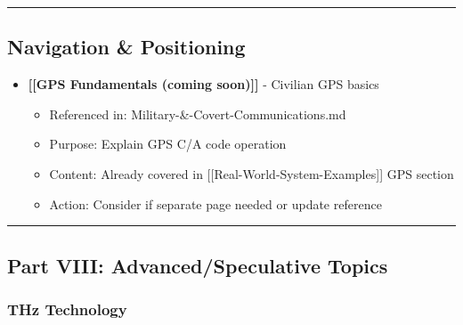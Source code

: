 \begin{center}\rule{0.5\linewidth}{0.5pt}\end{center}

\subsection{\texorpdfstring{ Navigation \&
Positioning}{ Navigation \& Positioning}}\label{navigation-positioning}

\begin{itemize}
\tightlist
\item
  \textbf{{[}{[}GPS Fundamentals (coming soon){]}{]}} - Civilian GPS
  basics

  \begin{itemize}
  \tightlist
  \item
    Referenced in: Military-\&-Covert-Communications.md
  \item
    Purpose: Explain GPS C/A code operation
  \item
    Content: Already covered in {[}{[}Real-World-System-Examples{]}{]}
    GPS section
  \item
    Action: Consider if separate page needed or update reference
  \end{itemize}
\end{itemize}

\begin{center}\rule{0.5\linewidth}{0.5pt}\end{center}

\subsection{\texorpdfstring{ Part VIII: Advanced/Speculative
Topics}{ Part VIII: Advanced/Speculative Topics}}\label{part-viii-advancedspeculative-topics}

\subsubsection{THz Technology}\label{thz-technology}

